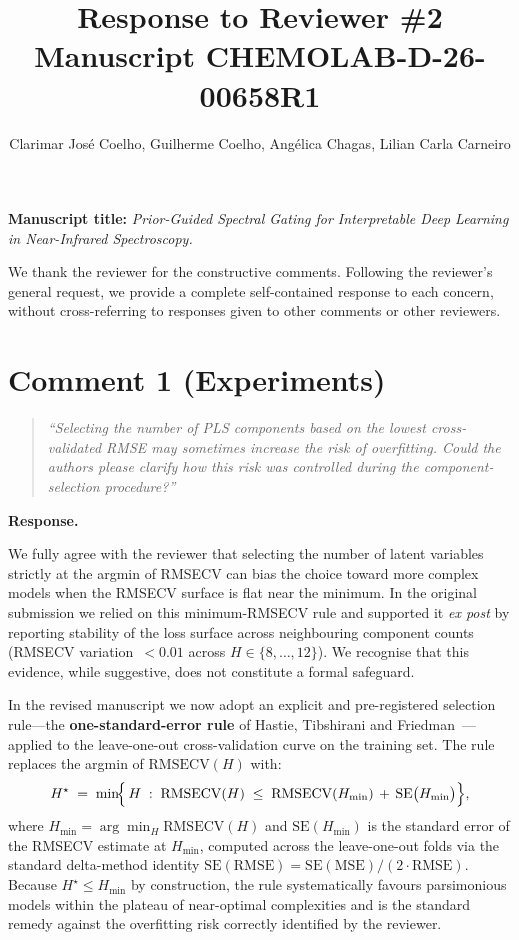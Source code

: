 \documentclass[11pt,a4paper]{article}
\title{Response to Reviewer \#2\\[0.3em]
       \large Manuscript CHEMOLAB-D-26-00658R1}
\author{Clarimar Jos\'{e} Coelho, Guilherme Coelho, Ang\'{e}lica Chagas,
        Lilian Carla Carneiro}
\date{}
\newenvironment{reviewercomment}
  {\begin{quote}\itshape}
  {\end{quote}}
\begin{document}
\maketitle

\vspace{-2em}
\noindent
\textbf{Manuscript title:} \emph{Prior-Guided Spectral Gating for
Interpretable Deep Learning in Near-Infrared Spectroscopy.}

\bigskip
\noindent We thank the reviewer for the constructive comments. Following
the reviewer's general request, we provide a complete self-contained
response to each concern, without cross-referring to responses given to
other comments or other reviewers.

\section*{Comment 1 (Experiments)}

\begin{reviewercomment}
``Selecting the number of PLS components based on the lowest
cross-validated RMSE may sometimes increase the risk of overfitting.
Could the authors please clarify how this risk was controlled during the
component-selection procedure?''
\end{reviewercomment}

\noindent\textbf{Response.}

We fully agree with the reviewer that selecting the number of latent
variables strictly at the argmin of RMSECV can bias the choice toward
more complex models when the RMSECV surface is flat near the minimum.
In the original submission we relied on this minimum-RMSECV rule and
supported it \emph{ex post} by reporting stability of the loss surface
across neighbouring component counts (RMSECV variation~$<0.01$ across
$H\in\{8,\ldots,12\}$). We recognise that this evidence, while
suggestive, does not constitute a formal safeguard.

In the revised manuscript we now adopt an explicit and pre-registered
selection rule---the \textbf{one-standard-error rule} of Hastie,
Tibshirani and Friedman~\cite{hastie2009elements}---applied to the
leave-one-out cross-validation curve on the training set. The rule
replaces the argmin of $\mathrm{RMSECV}(H)$ with:
%
\begin{equation}
  H^{\star} \;=\; \min\!\Bigl\{\, H \;:\;
    \mathrm{RMSECV}(H) \;\leq\;
    \mathrm{RMSECV}(H_{\min}) \,+\, \mathrm{SE}\bigl(H_{\min}\bigr)
  \Bigr\},
  \label{eq:onese}
\end{equation}
%
where $H_{\min}=\arg\min_{H}\mathrm{RMSECV}(H)$ and
$\mathrm{SE}(H_{\min})$ is the standard error of the RMSECV estimate at
$H_{\min}$, computed across the leave-one-out folds via the standard
delta-method identity
$\mathrm{SE}(\mathrm{RMSE})=\mathrm{SE}(\mathrm{MSE})/(2\cdot\mathrm{RMSE})$.
Because $H^{\star}\leq H_{\min}$ by construction, the rule systematically
favours parsimonious models within the plateau of near-optimal
complexities and is the standard remedy against the overfitting risk
correctly identified by the reviewer.
\end{document}
